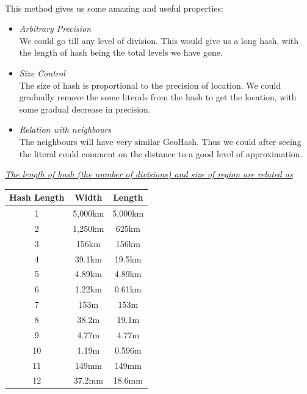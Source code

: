 \documentclass{article}
\begin{document}
    \pagebreak
    
    \paragraph{}
    This method gives us some amazing and useful properties:
    \begin{itemize}
        \item \emph{Arbitrary Precision}
        \\We could go till any level of division. This would give us a long hash, with the length of hash being the total levels we have gone.
        \item \emph{Size Control}
        \\The size of hash is proportional to the precision of location. We could gradually remove the some literals from the hash to get the location, with some gradual decrease in precision.
        \item \emph{Relation with neighbours}
        \\The neighbours will have very similar GeoHash. Thus we could after seeing the literal could comment on the distance to a good level of approximation. \\ 
    \end{itemize}
    \par
    
    \underline{\emph{The length of hash (the number of divisions) and size of region are related as}}
    \begin{center}
        \begin{tabular}{|c||c||c|}
             \hline
             Hash Length & Width & Length \\
             \hline
             1	& 5,000km	&	5,000km \\
             \hline
             2	& 1,250km	&	625km \\
             \hline
3	& 156km	&	156km \\
\hline
4	& 39.1km	&	19.5km \\
\hline
5	& 4.89km	&	4.89km \\
\hline
6	& 1.22km	&	0.61km \\
\hline
7	& 153m	&	153m \\
\hline
8	& 38.2m	&	19.1m \\
\hline
9	& 4.77m	&	4.77m \\
\hline
10	& 1.19m	&	0.596m \\
\hline
11	& 149mm	&	149mm \\
\hline
12	& 37.2mm	&	18.6mm \\
             \hline
        \end{tabular}
    \end{center}
\end{document}
